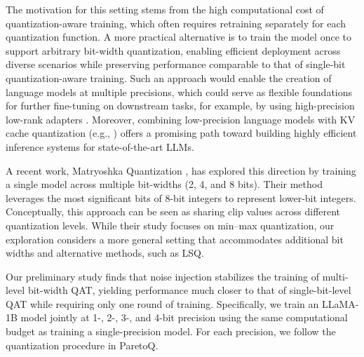 \documentclass{article}
\theoremstyle{definition}
\begin{document}
The motivation for this setting stems from the high computational cost of quantization-aware training, which often requires retraining separately for each quantization function. A more practical alternative is to train the model once to support arbitrary bit-width quantization, enabling efficient deployment across diverse scenarios while preserving performance comparable to that of single-bit quantization-aware training. Such an approach would enable the creation of language models at multiple precisions, which could serve as flexible foundations for further fine-tuning on downstream tasks, for example, by using high-precision low-rank adapters \citep{yin2024modulora}. Moreover, combining low-precision language models with KV cache quantization (e.g., \cite{zhang2024q}) offers a promising path toward building highly efficient inference systems for state-of-the-art LLMs.

A recent work, Matryoshka Quantization \citep{nair2025matryoshka}, has explored this direction by training a single model across multiple bit-widths (2, 4, and 8 bits). Their method leverages the most significant bits of 8-bit integers to represent lower-bit integers.  Conceptually, this approach can be seen as sharing clip values across different quantization levels. While their study focuses on min–max quantization, our exploration considers a more general setting that accommodates additional bit widths and alternative methods, such as LSQ. 

Our preliminary study finds that noise injection stabilizes the training of multi-level bit-width QAT, yielding performance much closer to that of single-bit-level QAT while requiring only one round of training. Specifically, we train an LLaMA-1B model jointly at 1-, 2-, 3-, and 4-bit precision using the same computational budget as training a single-precision model. For each precision, we follow the quantization procedure in ParetoQ. 
\end{document}
